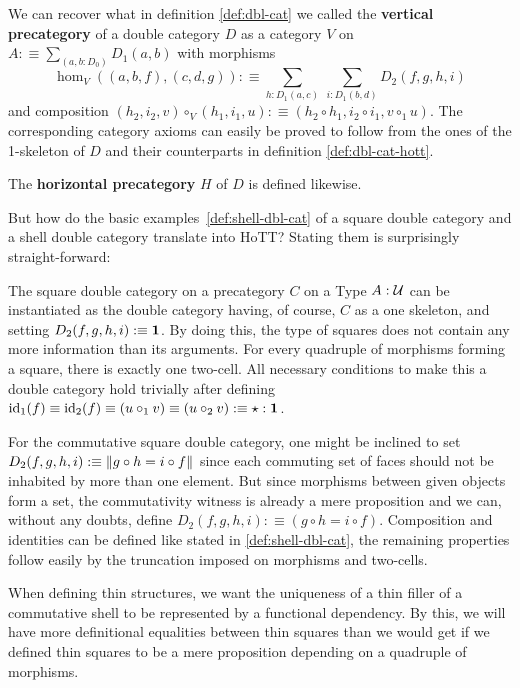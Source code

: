 \begin{defn}
We can recover what in definition \ref{def:dbl-cat} we called the \textbf{vertical
precategory} of a double category $D$ as a category $V$ on $A :\equiv
\sum_{(a,b : D_0)} D_1(a,b)$ with morphisms
\begin{equation*}
\hom_V((a,b,f),(c,d,g)) :\equiv \sum_{h:D_1(a,c)} ~ \sum_{i:D_1(b,d)} D_2(f,g,h,i)
\end{equation*}
and composition $(h_2,i_2,v) \circ_V (h_1,i_1,u) :\equiv
(h_2 \circ h_1, i_2 \circ i_1, v \circ_1 u)$.
The corresponding category axioms can easily be proved to follow from the ones
of the 1-skeleton of $D$ and their counterparts in definition \ref{def:dbl-cat-hott}.

The \textbf{horizontal precategory} $H$ of $D$ is defined likewise.
\end{defn}

But how do the basic examples~\ref{def:shell-dbl-cat} of a square double category
and a shell double category translate into HoTT? Stating them is surprisingly
straight-forward:

\begin{example} \label{def:shell-dbl-cat-hott}
The square double category on a precategory $C$ on a Type $A : \mathcal{U}$ can be instantiated
as the double category having, of course, $C$ as a one skeleton, and setting
$D_2(f,g,h,i) :\equiv \mathbf{1}$.
By doing this, the type of squares does not contain any more information than its
arguments.
For every quadruple of morphisms forming a square, there is exactly one two-cell.
All necessary conditions to make this a double category hold trivially after
defining $\operatorname{id}_1(f) \equiv \operatorname{id}_2(f) \equiv (u \circ_1 v) \equiv (u \circ_2 v) :\equiv
\star : \mathbf{1}$.

For the commutative square double category, one might be inclined to set
$D_2(f,g,h,i) :\equiv \left\Vert g \circ h = i \circ f\right\Vert_{}$ since each commuting
set of faces should not be inhabited by more than one element.
But since morphisms between given objects form a set, the commutativity witness
is already a mere proposition and we can, without any doubts, define
$D_2(f,g,h,i) :\equiv (g \circ h = i \circ f)$.
Composition and identities can be defined like stated in \ref{def:shell-dbl-cat},
the remaining properties follow easily by the truncation imposed on morphisms
and two-cells.
\end{example}

When defining thin structures, we want the uniqueness of a thin filler of a
commutative shell to be represented by a functional dependency.
By this, we will have more definitional equalities between thin squares than
we would get if we defined thin squares to be a mere proposition depending on
a quadruple of morphisms.

